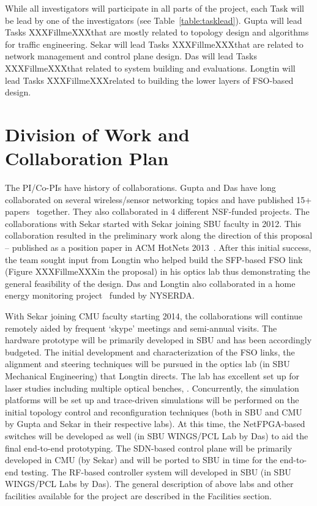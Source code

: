 \documentclass[11pt]{article}
\newcommand{\plsfill}{{\color{red}XXXFillmeXXX}}
\begin{document}
While all investigators will participate in all parts of the project, each
Task will be lead by one of the investigators (see Table~\ref{table:tasklead}). 
Gupta will lead Tasks \plsfill that are mostly related to topology design
and algorithms for traffic engineering. Sekar will lead Tasks \plsfill that are 
related to network management and control plane design. Das will lead
Tasks \plsfill that related to system building and evaluations. Longtin will lead 
Tasks \plsfill related to building the lower layers of FSO-based design. 

\section{Division of Work and Collaboration Plan}

The PI/Co-PIs have history of collaborations. Gupta and Das have long collaborated 
on several wireless/sensor networking topics and have published 15+ papers~\cite{} together. They  also
collaborated in 4 different NSF-funded projects.  The collaborations with Sekar started with Sekar 
joining SBU faculty in 2012. This collaboration resulted in the preliminary work along the 
direction of this proposal -- published as a position paper in ACM HotNets 2013~\cite{}. 
After this initial success, the team sought input from Longtin who helped build 
the SFP-based FSO link (Figure \plsfill in the proposal) in his optics lab thus demonstrating
the general feasibility of the design. 
Das and Longtin also collaborated in a home energy monitoring project~\cite{} funded by 
NYSERDA.

With Sekar joining CMU faculty starting 2014, the collaborations will continue  
remotely aided by frequent `skype' meetings and semi-annual visits. 
%
The hardware prototype will be primarily developed in SBU and has been
accordingly budgeted. The initial development and characterization of the  FSO
links, the alignment and steering techniques will be pursued in the optics lab
(in SBU Mechanical Engineering) that Longtin directs. The lab has excellent set
up for laser studies including multiple optical benches, . Concurrently, the
simulation platforms will be set up and trace-driven simulations will be
performed  on the initial topology control and reconfiguration techniques (both
in SBU and CMU by Gupta and Sekar in their respective labs). At this time, the
NetFPGA-based switches will be developed as well (in SBU WINGS/PCL Lab by Das)
to aid the final end-to-end prototyping.  The SDN-based control plane will be
primarily developed in CMU (by Sekar) and will be ported to SBU in time for the
end-to-end testing. The RF-based controller system will developed in SBU (in
SBU WINGS/PCL Labs by Das).  The general description of above labs and other
facilities available for the project are described in the Facilities section. 
\end{document}
